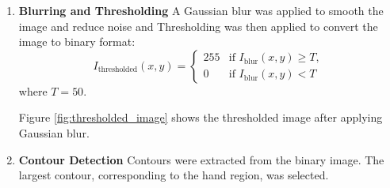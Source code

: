\begin{enumerate}
    \item \textbf{Blurring and Thresholding}
    A Gaussian blur was applied to smooth the image and reduce noise and Thresholding was then applied to convert the image to binary format:
    \begin{equation}
        I_{\text{thresholded}}(x, y) =
        \begin{cases}
        255 & \text{if } I_{\text{blur}}(x, y) \geq T, \\
        0 & \text{if } I_{\text{blur}}(x, y) < T
        \end{cases}   
    \end{equation} 
    where \( T = 50 \).

    Figure \ref{fig:thresholded_image} shows the thresholded image after applying Gaussian blur.

    \item \textbf{Contour Detection}
    Contours were extracted from the binary image. The largest contour, corresponding to the hand region, was selected. 


\end{enumerate}
